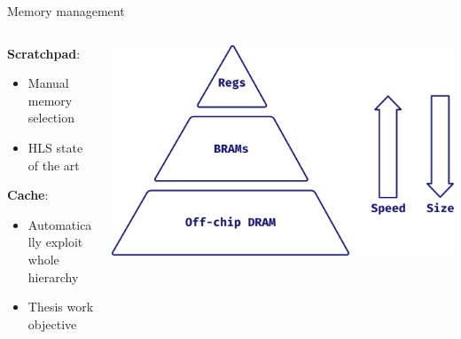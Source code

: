 \documentclass[aspectratio=169]{beamer}
\begin{document}
\begin{frame}{Memory management}
	\begin{columns}[c]
		\begin{column}{.55\textwidth}
			\textbf{Scratchpad}:
			\begin{itemize}
				\item Manual memory selection
				\item HLS state of the art
			\end{itemize}

			\bigskip

			\textbf{Cache}:
			\begin{itemize}
				\item Automatically exploit whole hierarchy
				\item<alert@+> Thesis work objective
			\end{itemize}
		\end{column}
		\begin{column}{.5\textwidth}
			\begin{center}
				\includegraphics[width=.9\textwidth]{mem_hierarchy}
			\end{center}
		\end{column}
	\end{columns}
\end{frame}
\end{document}
